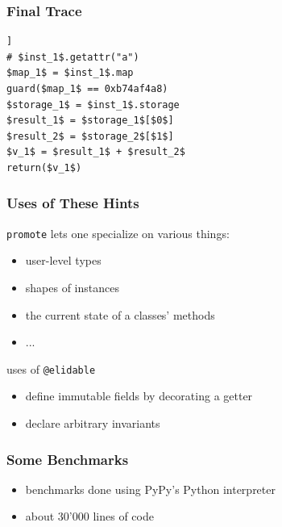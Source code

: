 \documentclass[utf8x]{beamer}
\begin{document}
\begin{frame}
  \frametitle{Final Trace}
\begin{lstlisting}[mathescape,escapechar=|,basicstyle=\ttfamily]]
# $inst_1$.getattr("a")
$map_1$ = $inst_1$.map
guard($map_1$ == 0xb74af4a8)
$storage_1$ = $inst_1$.storage
$result_1$ = $storage_1$[$0$]
$result_2$ = $storage_2$[$1$]
$v_1$ = $result_1$ + $result_2$
return($v_1$)
\end{lstlisting}
\end{frame}


\begin{frame}
  \frametitle{Uses of These Hints}
  \begin{block}{\texttt{promote} lets one specialize on various things:}
      \begin{itemize}
          \item user-level types
          \item shapes of instances
          \item the current state of a classes' methods
          \item ...
      \end{itemize}
  \end{block}
  \pause
  \begin{block}{uses of \texttt{@elidable}}
      \begin{itemize}
          \item define immutable fields by decorating a getter
          \item declare arbitrary invariants
      \end{itemize}
      
  \end{block}
\end{frame}

\begin{frame}
  \frametitle{Some Benchmarks}
  \begin{itemize}
      \item benchmarks done using PyPy's Python interpreter
      \item about 30'000 lines of code
  \end{itemize}
\end{frame}
\end{document}
